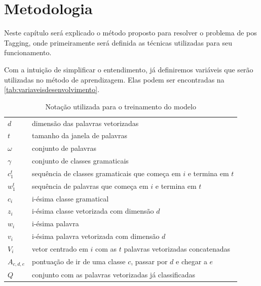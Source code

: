 \chapter{Metodologia}\label{desenvolvimento}

Neste capítulo será explicado o método proposto para resolver o problema de \ac{pos} Tagging, onde primeiramente será definida as técnicas utilizadas para seu funcionamento.

Com a intuição de simplificar o entendimento, já definiremos variáveis que serão utilizadas no método de aprendizagem. Elas podem ser encontradas na \autoref{tab:variaveisdesenvolvimento}.

\begin{table}[!htb]
\caption{Notação utilizada para o treinamento do modelo} \label{tab:variaveisdesenvolvimento}
\begin{center}
\begin{tabular}{m{2cm}m{12.0cm}}
  \toprule
  $d$		& dimensão das palavras vetorizadas \\
  $t$		& tamanho da janela de palavras \\
  $\omega$	& conjunto de palavras \\
  $\gamma$  & conjunto de classes gramaticais \\
  $c_1^t$  & sequência de classes gramaticais que começa em $i$ e termina em $t$ \\
  $w_1^t$  & sequência de palavras que começa em $i$ e termina em $t$ \\
  $c_i$		& i-ésima classe gramatical \\
  $z_i$		& i-ésima classe vetorizada com dimensão $d$ \\ 
  $w_i$		& i-ésima palavra\\
  $v_i$		& i-ésima palavra vetorizada com dimensão $d$ \\
  $V_i$		& vetor centrado em $i$ com as $t$ palavras vetorizadas concatenadas \\
  $A_{c,d,e}$ & pontuação de ir de uma classe $c$, passar por $d$ e chegar a $e$ \\
  $Q$	&	conjunto com as palavras vetorizadas já classificadas \\
  \bottomrule
\end{tabular}
\end{center}

\end{table}



